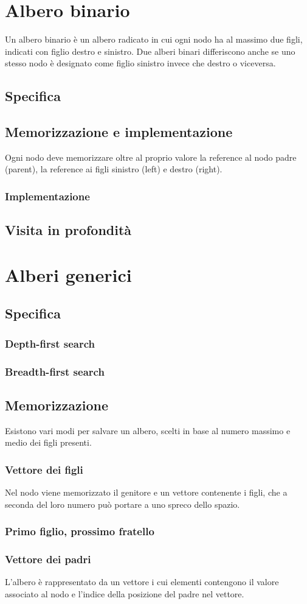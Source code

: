 \section{Albero binario}
Un albero binario \`e un albero radicato in cui ogni nodo ha al massimo due figli, indicati con figlio destro e sinistro. Due alberi binari differiscono
anche se uno stesso nodo \`e designato come figlio sinistro invece che destro o viceversa.
\subsection{Specifica}

\subsection{Memorizzazione e implementazione}
Ogni nodo deve memorizzare oltre al proprio valore la reference al nodo padre (parent), la reference ai figli sinistro (left) e destro (right).
\subsubsection{Implementazione}

\subsection{Visita in profondit\`a}

\section{Alberi generici}
\subsection{Specifica}

\subsubsection{Depth-first search}

\subsubsection{Breadth-first search}

\subsection{Memorizzazione}
Esistono vari modi per salvare un albero, scelti in base al numero massimo e medio dei figli presenti.
\subsubsection{Vettore dei figli}
Nel nodo viene memorizzato il genitore e un vettore contenente i figli, che a seconda del loro numero pu\`o portare a uno spreco dello spazio.
\newpage
\subsubsection{Primo figlio, prossimo fratello}

\subsubsection{Vettore dei padri}
L'albero \`e rappresentato da un vettore i cui elementi contengono il valore associato al nodo e l'indice della posizione del padre nel vettore.
